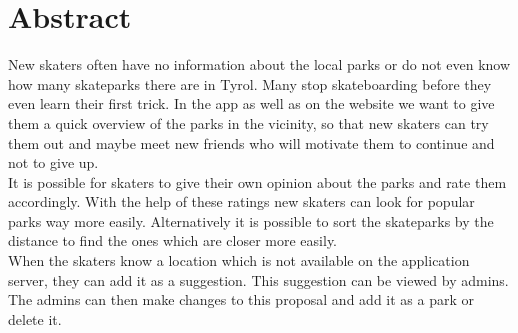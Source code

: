 \section*{Abstract}

New skaters often have no information about the local parks or do not even know how many
skateparks there are in Tyrol. Many stop skateboarding before they even learn their first trick. 
In the app as well as on the website we want to give them a quick overview of the parks 
in the vicinity, so that new skaters can try them out and maybe meet new friends who will motivate them to continue 
and not to give up.\\

It is possible for skaters to give their own opinion about the parks and rate them accordingly. 
With the help of these ratings new skaters can look for popular parks way more easily. 
Alternatively it is possible to sort the skateparks by the distance to find the ones which are 
closer more easily. \\

When the skaters know a location which is not available on the application server, they can 
add it as a suggestion. This suggestion can be viewed by admins. The admins 
can then make changes to this proposal and add it as a park or delete it.\\